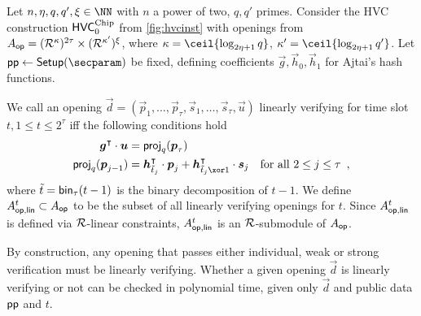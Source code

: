 \begin{definition}\label{def:linearlygoodopenings}
Let $n,\eta, q,q',\xi\in\NN$ with $n$ a power of two, $q,q'$ primes.
Consider the HVC construction $\mathsf{HVC}^{\textup{Chip}}_{0}$ from \autoref{fig:hvcinst} with openings from
$A_{\mathsf{op}} = (\mathcal{R}^\kappa)^{2\tau} \times (\mathcal{R}^{\kappa'})^\xi$, where $\limbs = \ceil{\log_{2\eta+1}q}$, $\limbs' = \ceil{\log_{2\eta+1}q'}$.
Let $\params\gets\setup(\secparam)$ be fixed, defining coefficients $\vec{g},\vec{h}_0,\vec{h}_1$ for Ajtai's hash functions.

We call an opening $\vec{d} = (\vec{p}_1,\ldots,\vec{p}_\tau, \vec{s}_1,\ldots,\vec{s}_\tau,\vec{u})$ linearly verifying for time slot $t, 1\leq t\leq 2^\tau$ iff the following conditions hold
\begin{align*}
\vec{g}^\transpose \cdot \vec{u} & =  \projmod{q}(\vec{p}_\tau)\\
\projmod{q}(\vec{p}_{j-1}) & = \vec{h}_{\tilde t_j}^\transpose\cdot \vec{p}_{j} + \vec{h}_{\tilde t_j \xor 1}^\transpose \cdot \vec{s}_{j}\quad \text{for all $2\leq j \leq \tau$}\enspace,
\end{align*}
where $\tilde{t} = \mathsf{bin}_{\tau}(t-1)$ is the binary decomposition of $t-1$. We define $A_{\mathsf{op,lin}}^{t}\subset A_{\mathsf{op}}$ to be the subset of all linearly verifying openings for $t$.
Since $A_{\mathsf{op,lin}}^{t}$ is defined via $\mathcal{R}$-linear constraints, $A_{\mathsf{op,lin}}^{t}$ is an $\mathcal{R}$-submodule of $A_{\mathsf{op}}$.
\end{definition}
By construction, any opening that passes either individual, weak or strong verification must be linearly verifying.
Whether a given opening $\vec{d}$ is linearly verifying or not can be checked in polynomial time, given only $\vec{d}$ and public data $\mathsf{pp}$ and $t$.

